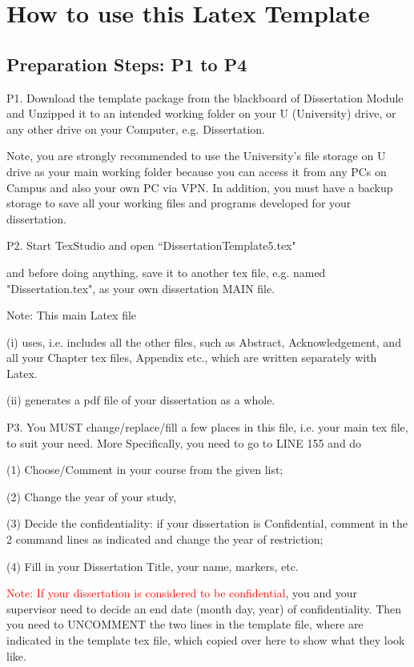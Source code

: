  
\section{How to use this Latex Template}
 
\subsection{Preparation Steps: P1 to P4} 
 
P1. Download the template package from the blackboard of Dissertation Module and Unzipped it to an intended working folder on your U (University) drive, or any other drive on your Computer, e.g. Dissertation. 

Note, you are strongly recommended to use the University's file storage on U drive as your main working folder because you can access it from any PCs on Campus and also your own PC via VPN. In addition, you must have a backup storage to save all your working files and programs developed for your dissertation.     

P2. Start TexStudio and open ``DissertationTemplate5.tex"

and before doing anything, save it to another tex file, e.g. named "Dissertation.tex", as your own dissertation MAIN file. 

Note: This main Latex file  

(i) uses, i.e. includes all the other files, such as Abstract, Acknowledgement, and all your Chapter tex files, Appendix etc., which are written separately with Latex.
 
(ii) generates a pdf file of your dissertation as a whole.         
 
P3. You MUST change/replace/fill a few places in this file, i.e. your main tex file, to suit your need. 
More Specifically, you need to go to LINE 155 and do 

(1) Choose/Comment in your course from the given list;

(2) Change the year of your study, 

(3) Decide the confidentiality: if your dissertation is Confidential,  comment in the 2 command lines as indicated and change the year of restriction;

(4) Fill in your Dissertation Title, your name, markers, etc.

\textcolor{red}
{Note: If your dissertation is considered to be confidential}, you and your supervisor need to decide an end date (month day, year) of confidentiality. Then you need to UNCOMMENT the two lines in the template file, where are indicated in the template tex file, which copied over here to show what they look like. 

